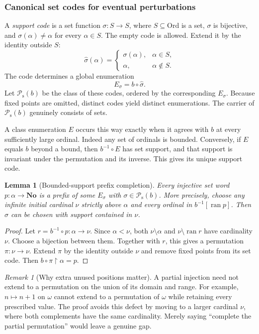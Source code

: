 \documentclass[11pt]{article}
\newtheorem{lemma}[lemma]{Lemma}
\theoremstyle{definition}
\theoremstyle{remark}
\newtheorem{remark}[remark]{Remark}
\newcommand{\No}{\mathbf{No}}
\newcommand{\Ord}{\mathrm{Ord}}
\newcommand{\Psupp}{\mathcal P_{\mathrm{s}}}
\newcommand{\ran}{\operatorname{ran}}
\newcommand{\res}{\mathbin{\upharpoonright}}
\begin{document}
\subsubsection{Canonical set codes for eventual perturbations}
A \emph{support code} is a set function $\sigma:S\to S$, where
$S\subseteq\Ord$ is a set, $\sigma$ is bijective, and
$\sigma(\alpha)\ne\alpha$ for every $\alpha\in S$. The empty code is
allowed. Extend it by the identity outside $S$:
\[
 \widehat\sigma(\alpha)=
 \begin{cases}\sigma(\alpha),&\alpha\in S,\\
               \alpha,&\alpha\notin S.
 \end{cases}
\]
The code determines a global enumeration
\begin{equation}
                  E_\sigma=b\circ\widehat\sigma.
 \label{swo:ec:eq:core-enumeration}
\end{equation}
Let $\Psupp(b)$ be the class of these codes, ordered by the corresponding
$E_\sigma$. Because fixed points are omitted, distinct codes yield
distinct enumerations. The carrier of $\Psupp(b)$ genuinely consists of
sets.

A class enumeration $E$ occurs this way exactly when it agrees with $b$
at every sufficiently large ordinal. Indeed any set of ordinals is
bounded. Conversely, if $E$ equals $b$ beyond a bound, then
$b^{-1}\circ E$ has set support, and that support is invariant under the
permutation and its inverse. This gives its unique support code.

\begin{lemma}[Bounded-support prefix completion]\label{swo:ec:lem:extension}
Every injective set word $p:\alpha\to\No$ is a prefix of some
$E_\sigma$ with $\sigma\in\Psupp(b)$. More precisely, choose any infinite
initial cardinal $\nu$ strictly above $\alpha$ and every ordinal in
$b^{-1}[\ran p]$. Then $\sigma$ can be chosen with support contained in
$\nu$.
\end{lemma}
\begin{proof}
Let $r=b^{-1}\circ p:\alpha\to\nu$. Since $\alpha<\nu$, both
$\nu\setminus\alpha$ and $\nu\setminus\ran r$ have cardinality $\nu$.
Choose a bijection between them. Together with $r$, this gives a
permutation $\pi:\nu\to\nu$. Extend $\pi$ by the identity outside $\nu$
and remove fixed points from its set code. Then
$b\circ\pi\res\alpha=p$.
\end{proof}

\begin{remark}[Why extra unused positions matter]\label{swo:ec:n8.2}
A partial injection need not extend to a permutation on the union of
its domain and range. For example, $n\mapsto n+1$ on $\omega$ cannot
extend to a permutation of $\omega$ while retaining every prescribed
value. The proof avoids this defect by moving to a larger cardinal
$\nu$, where both complements have the same cardinality. Merely saying
``complete the partial permutation'' would leave a genuine gap.
\end{remark}
\end{document}
